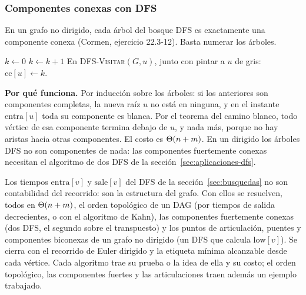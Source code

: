 \documentclass[11pt,letterpaper]{article}
\begin{document}
\subsubsection*{Componentes conexas con DFS}

En un grafo no dirigido, cada árbol del bosque DFS es exactamente una
componente conexa (Cormen, ejercicio 22.3-12). Basta numerar los
árboles.

\begin{algorithm}[H]
\caption{Cambio a \textsc{DFS} para numerar las componentes}
\label{alg:busq-componentes}
\begin{algorithmic}[1]
\State $k \gets 0$ 
    \State $k \gets k + 1$ 
    \State {}
  \EndIf
\EndFor
\Statex En \textsc{DFS-Visitar}$(G, u)$, junto con pintar a $u$ de
  gris: $\text{cc}[u] \gets k$.
\end{algorithmic}
\end{algorithm}

\textbf{Por qué funciona.} Por inducción sobre los árboles: si los
anteriores son componentes completas, la nueva raíz $u$ no está en
ninguna, y en el instante $\text{entra}[u]$ toda su componente es
blanca. Por el teorema del camino blanco, todo vértice de esa
componente termina debajo de $u$, y nada más, porque no hay aristas
hacia otras componentes. El costo es $\Theta\!\left(n + m\right)$. En un dirigido los
árboles DFS no son componentes de nada: las componentes fuertemente
conexas necesitan el algoritmo de dos DFS de la
sección~\ref{sec:aplicaciones-dfs}.

\newpage


\label{sec:aplicaciones-dfs}

\begin{quick_sum}
  Los tiempos $\text{entra}[v]$ y $\text{sale}[v]$ del DFS de la
  sección~\ref{sec:busquedas} no son contabilidad del recorrido: son
  la estructura del grafo. Con ellos se resuelven, todos en
  $\Theta\!\left(n + m\right)$, el orden topológico de un DAG (por tiempos de salida
  decrecientes, o con el algoritmo de Kahn), las componentes
  fuertemente conexas (dos DFS, el segundo sobre el transpuesto) y los
  puntos de articulación, puentes y componentes biconexas de un grafo
  no dirigido (un DFS que calcula $\text{low}[v]$). Se cierra con el
  recorrido de Euler dirigido y la etiqueta mínima alcanzable desde
  cada vértice. Cada algoritmo trae su prueba o la idea de ella y su
  costo; el orden topológico, las componentes fuertes y las
  articulaciones traen además un ejemplo trabajado.
\end{quick_sum}
\end{document}
